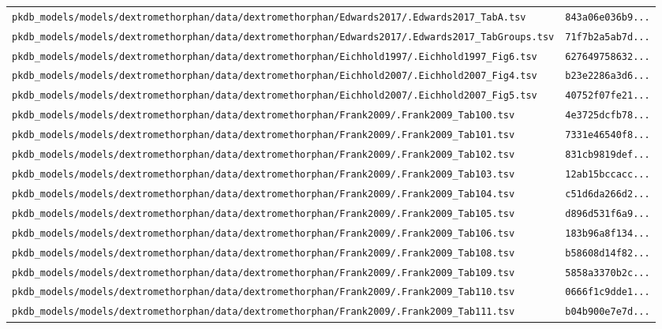 \documentclass{article}
\begin{document}
\begin{longtable}{ll}
\texttt{pkdb\_models/models/dextromethorphan/data/dextromethorphan/Edwards2017/.Edwards2017\_TabA.tsv} & \texttt{843a06e036b9...} \\
\texttt{pkdb\_models/models/dextromethorphan/data/dextromethorphan/Edwards2017/.Edwards2017\_TabGroups.tsv} & \texttt{71f7b2a5ab7d...} \\
\texttt{pkdb\_models/models/dextromethorphan/data/dextromethorphan/Eichhold1997/.Eichhold1997\_Fig6.tsv} & \texttt{627649758632...} \\
\texttt{pkdb\_models/models/dextromethorphan/data/dextromethorphan/Eichhold2007/.Eichhold2007\_Fig4.tsv} & \texttt{b23e2286a3d6...} \\
\texttt{pkdb\_models/models/dextromethorphan/data/dextromethorphan/Eichhold2007/.Eichhold2007\_Fig5.tsv} & \texttt{40752f07fe21...} \\
\texttt{pkdb\_models/models/dextromethorphan/data/dextromethorphan/Frank2009/.Frank2009\_Tab100.tsv} & \texttt{4e3725dcfb78...} \\
\texttt{pkdb\_models/models/dextromethorphan/data/dextromethorphan/Frank2009/.Frank2009\_Tab101.tsv} & \texttt{7331e46540f8...} \\
\texttt{pkdb\_models/models/dextromethorphan/data/dextromethorphan/Frank2009/.Frank2009\_Tab102.tsv} & \texttt{831cb9819def...} \\
\texttt{pkdb\_models/models/dextromethorphan/data/dextromethorphan/Frank2009/.Frank2009\_Tab103.tsv} & \texttt{12ab15bccacc...} \\
\texttt{pkdb\_models/models/dextromethorphan/data/dextromethorphan/Frank2009/.Frank2009\_Tab104.tsv} & \texttt{c51d6da266d2...} \\
\texttt{pkdb\_models/models/dextromethorphan/data/dextromethorphan/Frank2009/.Frank2009\_Tab105.tsv} & \texttt{d896d531f6a9...} \\
\texttt{pkdb\_models/models/dextromethorphan/data/dextromethorphan/Frank2009/.Frank2009\_Tab106.tsv} & \texttt{183b96a8f134...} \\
\texttt{pkdb\_models/models/dextromethorphan/data/dextromethorphan/Frank2009/.Frank2009\_Tab108.tsv} & \texttt{b58608d14f82...} \\
\texttt{pkdb\_models/models/dextromethorphan/data/dextromethorphan/Frank2009/.Frank2009\_Tab109.tsv} & \texttt{5858a3370b2c...} \\
\texttt{pkdb\_models/models/dextromethorphan/data/dextromethorphan/Frank2009/.Frank2009\_Tab110.tsv} & \texttt{0666f1c9dde1...} \\
\texttt{pkdb\_models/models/dextromethorphan/data/dextromethorphan/Frank2009/.Frank2009\_Tab111.tsv} & \texttt{b04b900e7e7d...} \\

\end{longtable}
\end{document}
